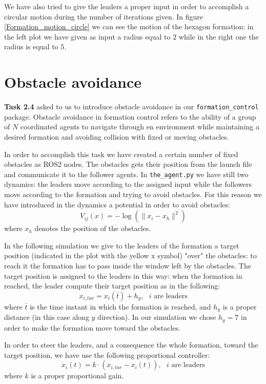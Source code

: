 \documentclass[a4paper,11pt,oneside]{book}
\begin{document}
\bigskip
We have also tried to give the leaders a proper input in order to accomplish a circular motion during the number of iterations given. In figure \ref{Formation_motion_circle} we can see the motion of the hexagon formation: in the left plot we have given as input a radius equal to $2$ while in the right one the radius is equal to $5$.



\section{Obstacle avoidance}
\textbf{Task 2.4} asked to us to introduce obstacle avoidance in our \texttt{formation\_control} package. Obstacle avoidance in formation control refers to the ability of a group of $N$ coordinated agents to navigate through en environment while maintaining a desired formation and avoiding collision with fixed or moving obstacles. 

In order to accomplish this task we have created a certain number of fixed obstacles as ROS2 nodes. The obstacles gets their position from the launch file and communicate it to the follower agents. 
In \texttt{the\_agent.py} we have still two dynamics: the leaders move according to the assigned input while the followers move according to the formation and trying to avoid obstacles. For this reason we have introduced in the dynamics a potential in order to avoid obstacles:
\begin{equation}
V_{ij}(x) = - \log( \lVert x_i - x_h\rVert ^2)
\label{Obstacles_barrier}
\end{equation}
where $x_h$ denotes the position of the obstacles.

\bigskip
In the following simulation we give to the leaders of the formation a target position (indicated in the plot with the yellow x symbol) "over" the obstacles: to reach it the formation has to pass inside the window left by the obstacles. 
The target position is assigned to the leaders in this way: when the formation in reached, the leader compute their target position as in the following:
\begin{equation}
x_{i,tar} = x_i(\bar{t}) + h_y, \text{     $i$ are leaders}
\end{equation}
where $\bar{t}$ is the time instant in which the formation is reached, and $h_y$ is a proper distance (in this case along $y$ direction). In our simulation we chose $h_y = 7$ in order to make the formation move toward the obstacles.

\bigskip
In order to steer the leaders, and a consequence the whole formation, toward the target position, we have use the following proportional controller:
\begin{equation}
\dot{x}_i(t) = k\cdot (x_{i,tar} - x_i(t)), \text{     $i$ are leaders}
\end{equation}
where $k$ is a proper proportional gain.
\end{document}
